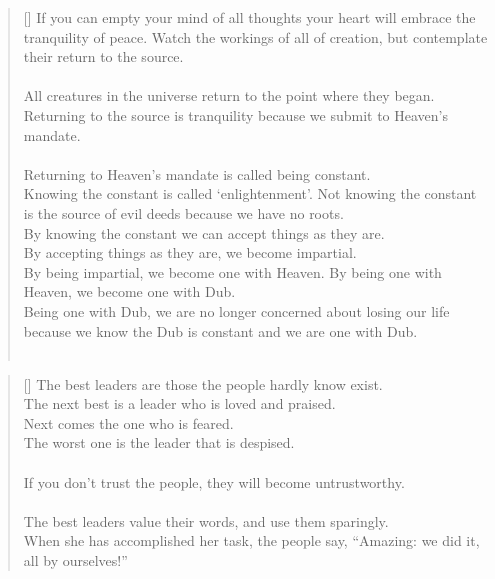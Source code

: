 \documentclass{article}
\begin{document}
\settowidth{\versewidth}{The Wizard leads byemptying people’s minds, filling their bellies, weakening their am- bitions, and making them become strong}
\begin{verse}[\versewidth]
If you can empty your mind of all thoughts your heart will embrace the tranquility of peace. 
Watch the workings of all of creation, but contemplate their return to the source.\\
\hfill\\
All creatures in the universe return to the point where they began. 
Returning to the source is tranquility because we submit to Heaven's mandate.\\
\hfill\\
Returning to Heaven's mandate is called being constant.\\
Knowing the constant is called `enlightenment'. 
Not knowing the constant is the source of evil deeds because we have no roots.\\
By knowing the constant we can accept things as they are.\\
By accepting things as they are, we become impartial.\\
By being impartial, we become one with Heaven. 
By being one with Heaven, we become one with Dub.\\
Being one with Dub, we are no longer concerned about losing our life because we know the Dub is constant and we are one with Dub.\\
\hfill\\
\end{verse}

\settowidth{\versewidth}{The Wizard leads byemptying people’s minds, filling their bellies, weakening their am- bitions, and making them become strong}
\begin{verse}[\versewidth]
The best leaders are those the people hardly know exist.\\
The next best is a leader who is loved and praised.\\
Next comes the one who is feared.\\
The worst one is the leader that is despised.\\
\hfill\\
If you don't trust the people, they will become untrustworthy.\\
\hfill\\
The best leaders value their words, and use them sparingly.\\
When she has accomplished her task, the people say, ``Amazing: we did it, all by ourselves!''

\end{verse}
\end{document}
